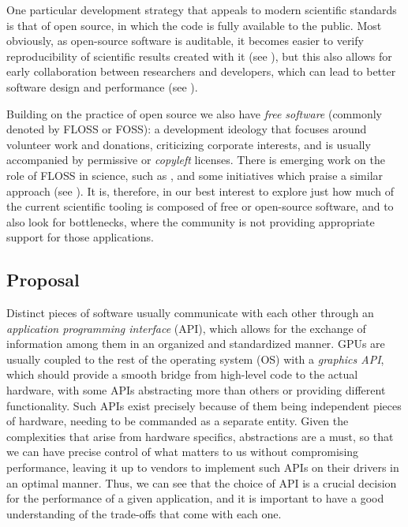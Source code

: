 \documentclass[conference, onecolumn]{IEEEtran}
\begin{document}
One particular development strategy that appeals to modern scientific standards
is that of open source, in which the code is fully available to the public.
Most obviously, as open-source software is auditable, it becomes easier to
verify reproducibility of scientific results created with it (see
\cite{barba2022defining}), but this also allows for early collaboration between
researchers and developers, which can lead to better software design and
performance (see \cite{wilson2014best}).

Building on the practice of open source we also have \textit{free software}
(commonly denoted by FLOSS or FOSS): a development ideology that focuses around
volunteer work and donations, criticizing corporate interests, and is usually
accompanied by permissive or \textit{copyleft} licenses.
There is emerging work on the role of FLOSS in science, such as
\cite{fortunato2021case}, and some initiatives which praise a similar approach
(see \cite{katz2018community, barker2022introducing}).
It is, therefore, in our best interest to explore just how much of the current
scientific tooling is composed of free or open-source software, and to also
look for bottlenecks, where the community is not providing appropriate support
for those applications.

\subsection{Proposal} \label{sec:intro:proposal}

Distinct pieces of software usually communicate with each other through an
\textit{application programming interface} (API), which allows for the exchange
of information among them in an organized and standardized manner.
GPUs are usually coupled to the rest of the operating system (OS) with a
\textit{graphics API}, which should provide a smooth bridge from high-level
code to the actual hardware, with some APIs abstracting more than others or
providing different functionality.
Such APIs exist precisely because of them being independent pieces of hardware,
needing to be commanded as a separate entity.
Given the complexities that arise from hardware specifics, abstractions are a
must, so that we can have precise control of what matters to us without
compromising performance, leaving it up to vendors to implement such APIs on
their drivers in an optimal manner.
Thus, we can see that the choice of API is a crucial decision for the
performance of a given application, and it is important to have a good
understanding of the trade-offs that come with each one.
\end{document}
